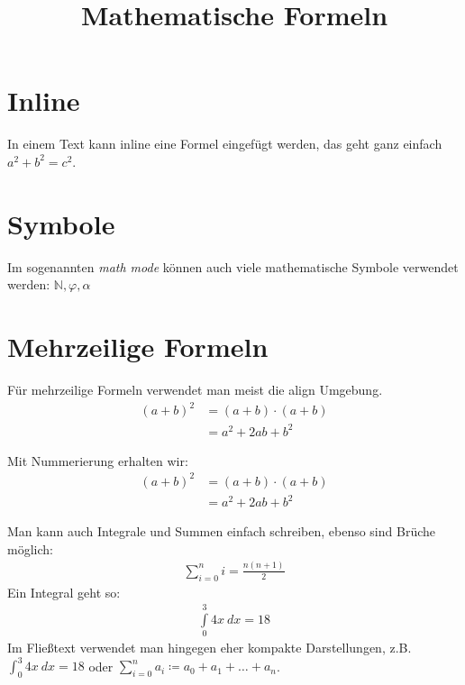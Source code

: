 \documentclass[a4paper]{scrartcl}
\title{Mathematische Formeln}
\author{}
\date{}
\begin{document}
\maketitle

\section*{Inline}
In einem Text kann inline eine Formel eingefügt werden, das geht ganz einfach \(a^2 + b^2 = c^2\).

\section*{Symbole}
Im sogenannten \textit{math mode} können auch viele mathematische Symbole verwendet werden: \(\mathbb{N}, \varphi, \alpha\)

\section*{Mehrzeilige Formeln}
Für mehrzeilige Formeln verwendet man meist die align Umgebung.
\begin{align*}
(a + b)^2 &= (a + b) \cdot (a + b)\\
          &= a^2 + 2ab + b^2
\end{align*}

Mit Nummerierung erhalten wir:
\begin{align}
(a + b)^2 &= (a + b) \cdot (a + b)\\
          &= a^2 + 2ab + b^2
\end{align}

Man kann auch Integrale und Summen einfach schreiben, ebenso sind Brüche möglich:
\begin{align*}
    \sum\limits_{i=0}^n i = \frac{n (n + 1)}{2}
\end{align*}
Ein Integral geht so:
\begin{align*}
    \int\limits_0^3 4x\ dx = 18
\end{align*}
Im Fließtext verwendet man hingegen eher kompakte Darstellungen, z.B. \(\int_0^3 4x\ dx = 18\) oder \(\sum_{i=0}^n a_i \coloneqq a_0 + a_1 + \dots + a_n \).
\end{document}
